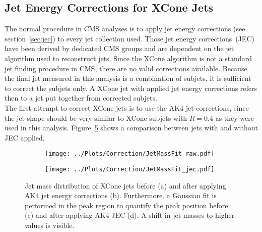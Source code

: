 \subsection{Jet Energy Corrections for XCone Jets} 
	The normal procedure in CMS analyses is to apply jet energy corrections (see section~\ref{sec:jec}) to every jet collection used. Those jet energy corrections~(JEC) have been derived by dedicated CMS groups and are dependent on the jet algorithm used to reconstruct jets. Since the XCone algorithm is not a standard jet finding procedure in CMS, there are no valid corrections available. Because the final jet measured in this analysis is a combination of subjets, it is sufficient to correct the subjets only. A XCone jet with applied jet energy corrections refers then to a jet put together from corrected subjets. \\
	The first attempt to correct XCone jets is to use the AK4 jet corrections, since the jet shape should be very similar to XCone subjets with $R=0.4$ as they were used in this analysis. Figure~\ref{fig:MJet_jec} shows a comparison between jets with and without JEC applied. 
 	\begin{figure}[tb]
 		\begin{subfigure}{.5\textwidth}
 		\centering
 		\caption{}
 		\label{fig:MJet_jec1}
 		\end{subfigure}
 		\begin{subfigure}{.5\textwidth}
 		\centering
 		\caption{}
 		\label{fig:MJet_jec2}
 		\end{subfigure}
 		\begin{subfigure}{.5\textwidth}
 		\centering
		\texttt{[image: ../Plots/Correction/JetMassFit\_raw.pdf]}
		\caption{}
 		\label{fig:MJet_jec1b}
 		\end{subfigure}
 		\begin{subfigure}{.5\textwidth}
 		\centering
		\texttt{[image: ../Plots/Correction/JetMassFit\_jec.pdf]}
 		\caption{}
 		\label{fig:MJet_jec2b}
 		\end{subfigure} 		
 		\caption{Jet mass distribution of XCone jets before (a) and after applying AK4 jet energy corrections (b). Furthermore, a Gaussian fit is performed in the peak region to quantify the peak position before (c) and after applying AK4 JEC (d). A shift in jet masses to higher values is visible.}
 		\label{fig:MJet_jec}
 	\end{figure}	
